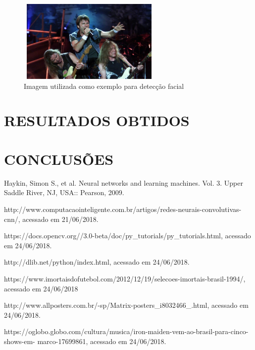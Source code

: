 \documentclass[conference]{IEEEtran}
\begin{document}
         \begin{figure}[h!b]
			\centering \includegraphics[width=7cm,height=4cm]{iron.jpg}
			\caption{Imagem utilizada como exemplo para detecção facial \cite{b7}} 
		\end{figure}

	\section{RESULTADOS OBTIDOS}
	
	\section{CONCLUSÕES}

          
         
	  \begin{thebibliography}{00}
	  
		 Haykin, Simon S., et al. Neural networks and learning machines. Vol. 3. Upper Saddle River, NJ, 			USA:: Pearson, 2009.
		
		 http://www.computacaointeligente.com.br/artigos/redes-neurais-convolutivas-cnn/, acessado em 		        21/06/2018.
		
		 https://docs.opencv.org//3.0-beta/doc/py\_tutorials/py\_tutorials.html, acessado em 24/06/2018.
		
		 http://dlib.net/python/index.html, acessado em 24/06/2018.
		
		 https://www.imortaisdofutebol.com/2012/12/19/selecoes-imortais-brasil-1994/, acessado em                                                                   		24/06/2018
		
		 http://www.allposters.com.br/-sp/Matrix-posters\_i8032466\_.html, acessado em 24/06/2018.

		 https://oglobo.globo.com/cultura/musica/iron-maiden-vem-ao-brasil-para-cinco-shows-em-						marco-17699861, acessado em 24/06/2018.



		
	  \end{thebibliography}
\end{document}
